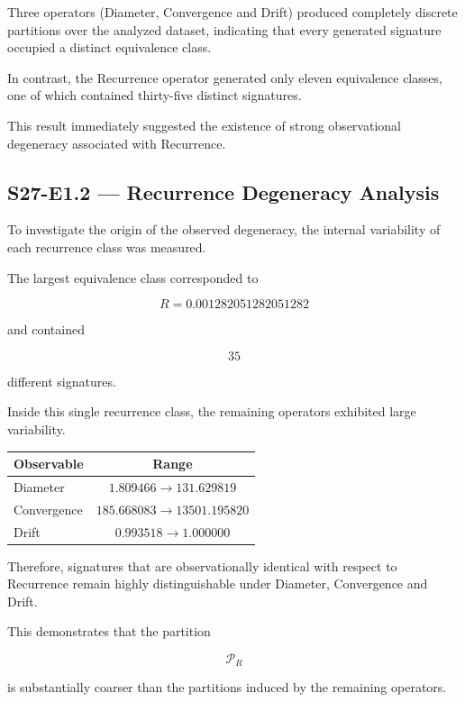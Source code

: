 Three operators (Diameter, Convergence and Drift) produced completely discrete partitions over the analyzed dataset, indicating that every generated signature occupied a distinct equivalence class.

In contrast, the Recurrence operator generated only eleven equivalence classes, one of which contained thirty-five distinct signatures.

This result immediately suggested the existence of strong observational degeneracy associated with Recurrence.

\subsection{S27-E1.2 --- Recurrence Degeneracy Analysis}

To investigate the origin of the observed degeneracy, the internal variability of each recurrence class was measured.

The largest equivalence class corresponded to

\[
R=0.001282051282051282
\]

and contained

\[
35
\]

different signatures.

Inside this single recurrence class, the remaining operators exhibited large variability.

\begin{center}
\begin{tabular}{lc}
\hline
Observable & Range\\
\hline
Diameter &
$1.809466 \rightarrow 131.629819$\\

Convergence &
$185.668083 \rightarrow 13501.195820$\\

Drift &
$0.993518 \rightarrow 1.000000$\\
\hline
\end{tabular}
\end{center}

Therefore, signatures that are observationally identical with respect to Recurrence remain highly distinguishable under Diameter, Convergence and Drift.

This demonstrates that the partition

\[
\mathcal P_R
\]

is substantially coarser than the partitions induced by the remaining operators.

